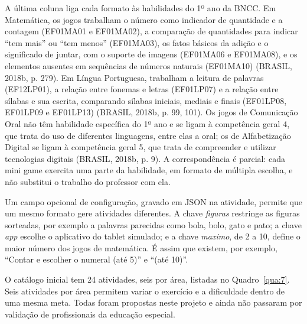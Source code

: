 A última coluna liga cada formato às habilidades do 1º ano da BNCC. Em Matemática, os jogos trabalham o número como indicador de quantidade e a contagem (EF01MA01 e EF01MA02), a comparação de quantidades para indicar “tem mais” ou “tem menos” (EF01MA03), os fatos básicos da adição e o significado de juntar, com o suporte de imagens (EF01MA06 e EF01MA08), e os elementos ausentes em sequências de números naturais (EF01MA10) (BRASIL, 2018b, p. 279). Em Língua Portuguesa, trabalham a leitura de palavras (EF12LP01), a relação entre fonemas e letras (EF01LP07) e a relação entre sílabas e sua escrita, comparando sílabas iniciais, mediais e finais (EF01LP08, EF01LP09 e EF01LP13) (BRASIL, 2018b, p. 99, 101). Os jogos de Comunicação Oral não têm habilidade específica do 1º ano e se ligam à competência geral 4, que trata do uso de diferentes linguagens, entre elas a oral; os de Alfabetização Digital se ligam à competência geral 5, que trata de compreender e utilizar tecnologias digitais (BRASIL, 2018b, p. 9). A correspondência é parcial: cada mini game exercita uma parte da habilidade, em formato de múltipla escolha, e não substitui o trabalho do professor com ela.

Um campo opcional de configuração, gravado em JSON na atividade, permite que um mesmo formato gere atividades diferentes. A chave \textit{figuras} restringe as figuras sorteadas, por exemplo a palavras parecidas como bola, bolo, gato e pato; a chave \textit{app} escolhe o aplicativo do tablet simulado; e a chave \textit{maximo}, de 2 a 10, define o maior número dos jogos de matemática. É assim que existem, por exemplo, “Contar e escolher o numeral (até 5)” e “(até 10)”.

O catálogo inicial tem 24 atividades, seis por área, listadas no Quadro~\ref{qua:7}. Seis atividades por área permitem variar o exercício e a dificuldade dentro de uma mesma meta. Todas foram propostas neste projeto e ainda não passaram por validação de profissionais da educação especial.

